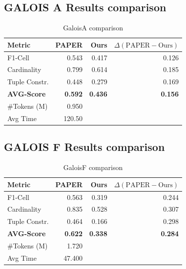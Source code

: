 \subsection{GALOIS A Results comparison}

\begin{table}[H]
\centering
\begin{tabular}{lrrr}
\hline
Metric & PAPER & Ours & $\Delta(\text{PAPER} - \text{Ours})$ \\
\hline
F1-Cell       & 0.543 & 0.417 & 0.126 \\
Cardinality   & 0.799 & 0.614 & 0.185 \\
Tuple Constr. & 0.448 & 0.279 & 0.169 \\
\textbf{AVG-Score} & \textbf{0.592} & \textbf{0.436} & \textbf{0.156} \\
\#Tokens (M)  & 0.950 &      &       \\
Avg Time      & 120.50 &     &       \\
\hline
\end{tabular}
\caption{GaloisA comparison}
\label{galoisA_results}
\end{table}

\subsection{GALOIS F Results comparison}

\begin{table}[H]
\centering
\begin{tabular}{lrrr}
\hline
Metric & PAPER & Ours & $\Delta(\text{PAPER} - \text{Ours})$ \\
\hline
F1-Cell       & 0.563 & 0.319 & 0.244 \\
Cardinality   & 0.835 & 0.528 & 0.307 \\
Tuple Constr. & 0.464 & 0.166 & 0.298 \\
\textbf{AVG-Score} & \textbf{0.622} & \textbf{0.338} & \textbf{0.284} \\
\#Tokens (M)  & 1.720 &      &       \\
Avg Time      & 47.400 &     &       \\
\hline
\end{tabular}
\caption{GaloisF comparison}
\label{galoisF_results}
\end{table}